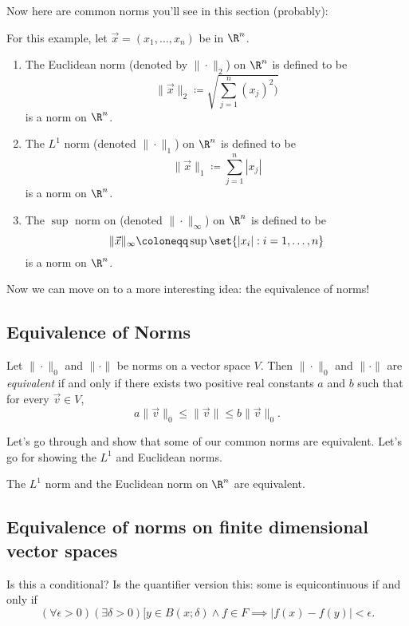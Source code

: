 \documentclass[class=article, crop=false]{standalone}
\begin{document}
Now here are common norms you'll see in this section (probably):
\begin{ex}
    For this example, let $\vec x = (x_1, \ldots, x_n)$ be in $\R^n$.
    \begin{enumerate}[$\bullet$]
        \item The Euclidean norm (denoted by $\|\cdot\|_2$) on $\R^n$ is defined to be
            \[
                \| \vec x \|_2 \coloneqq \sqrt{\sum_{j=1}^{n} (x_j)^2)}
            \]
        is a norm on $\R^n$.

        \item The $L^1$ norm (denoted $\|\cdot\|_1$) on $\R^n$ is defined to be
            \[
                \| \vec x \|_1 \coloneqq \sum_{j=1}^{n} |x_j|
            \]
        is a norm on $\R^n$.

        \item The $\sup$ norm on (denoted $\|\cdot\|_\infty$) on $\R^n$ is defined to be
            \[
                \| \vec x\|_\infty \coloneqq \sup \set{|x_i| : i=1,\ldots,n}
            \]
        is a norm on $\R^n$.
    \end{enumerate}
\end{ex}

Now we can move on to a more interesting idea: the equivalence of norms!

\subsection{Equivalence of Norms}

\begin{defn}
    Let $\| \cdot \|_0$ and $\| \cdot \|$ be norms on a vector space $V$. Then $\| \cdot \|_0$ and $\| \cdot \|$ are \textit{equivalent} if and only if there exists two positive real constants $a$ and $b$ such that for every $\vec v \in V$,
        \[
            a \| \vec v \|_0 \leq \| \vec v \| \leq b\| \vec v \|_0.
        \]
\end{defn}


Let's go through and show that some of our common norms are equivalent. Let's go for showing the $L^1$ and Euclidean norms.

\begin{fact}
    The $L^1$ norm and the Euclidean norm on $\R^n$ are equivalent.
\end{fact}
\begin{pf}

\end{pf}

\subsection{Equivalence of norms on finite dimensional vector spaces}

Is this a conditional? Is the quantifier version this: some is equicontinuous if and only if
\[
(\forall \epsilon > 0) (\exists \delta > 0) [y \in B(x;\delta) \land f \in F \implies |f(x)-f(y)| < \epsilon.
\]
\end{document}
